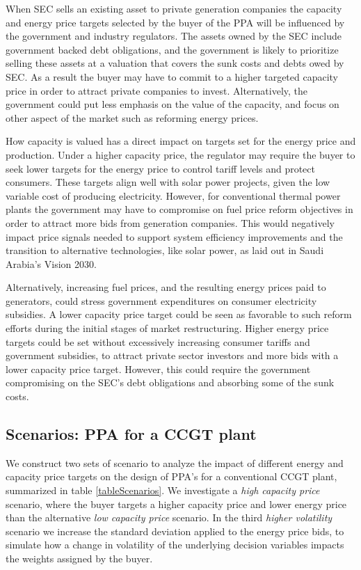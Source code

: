 \documentclass[informs]{informs3}
\begin{document}
When SEC sells an existing asset to private generation companies the  capacity and energy price targets selected by the buyer of the PPA will be influenced by the government and industry regulators. The assets owned by the SEC include government backed debt obligations, and the government is likely to prioritize selling these assets at a valuation that covers the sunk costs and debts owed by SEC. As a result the buyer may have to commit to a higher targeted capacity price in order to attract private companies to invest. Alternatively, the government could put less emphasis on the value of the capacity, and focus on other aspect of the market such as reforming energy prices.
 
How capacity is valued has a direct impact on targets set for the energy price and production. Under a higher capacity price, the regulator may require the buyer to seek lower targets for the energy price to control tariff levels and protect consumers. These targets align well with solar power projects, given the low variable cost of producing electricity. However, for conventional thermal power plants the government may have to compromise on fuel price reform objectives in order to attract more bids from generation companies. This would negatively impact price signals needed to support system efficiency improvements and the transition to alternative technologies, like solar power, as laid out in Saudi Arabia’s Vision 2030. 

Alternatively, increasing fuel prices, and the resulting energy prices paid to generators, could stress government expenditures on consumer electricity subsidies. A lower capacity price target could be seen as favorable to such reform efforts during the initial stages of market restructuring. Higher energy price targets could be set without excessively increasing consumer tariffs and government subsidies, to attract private sector investors and more bids with a lower capacity price target. However, this could require the government compromising on the SEC’s debt obligations and absorbing some of the sunk costs.

\subsection{Scenarios: PPA for a CCGT plant }\label{subsection_ScenarioDesign}

We construct two sets of scenario to analyze the impact of different energy and capacity price targets on the design of PPA's for a conventional CCGT plant,  summarized in table \ref{tableScenarios}. We investigate a \textit{high capacity price} scenario, where the buyer targets a higher capacity price and lower energy price than the alternative \textit{low capacity price} scenario. In the third \textit{higher volatility} scenario we increase the standard deviation applied to the energy price bids, to simulate how a change in volatility of the underlying decision variables impacts the weights assigned by the buyer.
\end{document}
